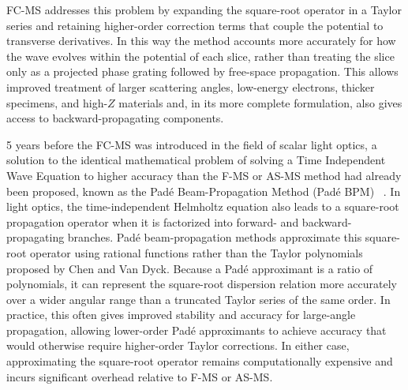 \documentclass[preprint,12pt,number]{elsarticle}
\begin{document}
FC-MS addresses this problem by expanding the square-root
operator in a Taylor series and retaining higher-order correction terms that
couple the potential to transverse derivatives. In this way the method accounts
more accurately for how the wave evolves within the potential of each slice,
rather than treating the slice only as a projected phase grating followed by
free-space propagation. This allows improved treatment of larger scattering
angles, low-energy electrons, thicker specimens, and high-$Z$ materials and,
in its more complete formulation, also gives access to backward-propagating
components.

5 years before the FC-MS was introduced in the field of scalar light 
optics, a solution to the identical mathematical problem of solving a Time Independent Wave Equation
to higher accuracy than the F-MS or AS-MS method had already been proposed, known as 
the Pad\'e Beam-Propagation Method (Pad\'e BPM)
~\cite{Hadley1992}. In light optics, the time-independent Helmholtz equation also
leads to a square-root propagation operator when it is factorized into forward-
and backward-propagating branches. Pad\'e beam-propagation methods approximate
this square-root operator using rational functions rather than the Taylor
polynomials proposed by Chen and Van Dyck. Because a Pad\'e approximant is a ratio
of polynomials, it can represent the square-root dispersion relation more
accurately over a wider angular range than a truncated Taylor series of the
same order. In practice, this often gives improved stability and accuracy for
large-angle propagation, allowing lower-order Pad\'e approximants to achieve
accuracy that would otherwise require higher-order Taylor corrections. In
either case, approximating the square-root operator remains computationally
expensive and incurs significant overhead relative to F-MS or AS-MS.
\end{document}
